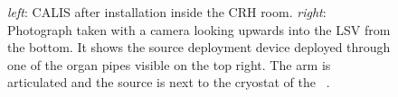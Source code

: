 \begin{figure}[htbp]
 \centering
{}
\caption{\textit{left}: CALIS after installation inside the CRH room. \textit{right}: Photograph taken with a camera looking upwards into the LSV from the bottom. It shows the source deployment device deployed through one of the organ pipes visible on the top right. The arm is articulated and the source is next to the cryostat of the \lar\ \tpc.
\label{fig:CALIS_photos}}
\end{figure}


















